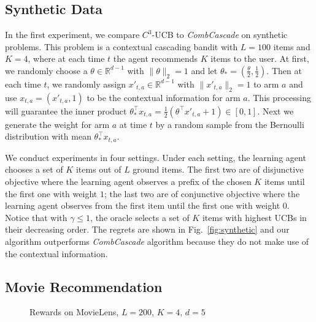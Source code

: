 \documentclass{article}
\newcommand{\RR}{\mathbb{R}}
\begin{document}
\subsection{Synthetic Data}
\label{sec:ExpSyn}

In the first experiment, we compare $C^3$-UCB to {\it CombCascade} on synthetic problems. This problem is a contextual cascading bandit with $L=100$ items and $K=4$, where at each time $t$ the agent recommends $K$ items to the user. At first, we randomly choose a $\theta \in \RR^{d-1}$ with $\|\theta \|_2 = 1$ and let $\theta_* = (\frac{\theta}{2}, \frac{1}{2})$. Then at each time $t$, we randomly assign $x'_{t,a} \in \RR^{d-1}$ with $\|x'_{t,a}\|_2 = 1$ to arm $a$ and use $x_{t,a} = (x'_{t,a}, 1)$ to be the contextual information for arm $a$. This processing will guarantee the inner product $\theta_*^{\top}x_{t,a} = \frac{1}{2}(\theta^{\top}x'_{t,a} + 1) \in [0,1]$. Next we generate the weight for arm $a$ at time $t$ by a random sample from the Bernoulli distribution with mean $\theta_*^{\top}x_{t,a}$.

We conduct experiments in four settings. Under each setting, the learning agent chooses a set of $K$ items out of $L$ ground items. The first two are of disjunctive objective where the learning agent observes a prefix of the chosen $K$ items until the first one with weight $1$; the last two are of conjunctive objective where the learning agent observes from the first item until the first one with weight $0$. Notice that with $\gamma \leq 1$, the oracle selects a set of $K$ items with highest UCBs in their decreasing order. The regrets are shown in Fig.~\ref{fig:synthetic} and our algorithm outperforms {\it CombCascade} algorithm because they do not make use of the contextual information.


\subsection{Movie Recommendation}
\label{sec:movie}

\begin{figure}
	\centering
	\caption{Rewards on MovieLens, $L=200$, $K=4$, $d=5$}
	\label{fig:movielens} %
\end{figure}
\end{document}
